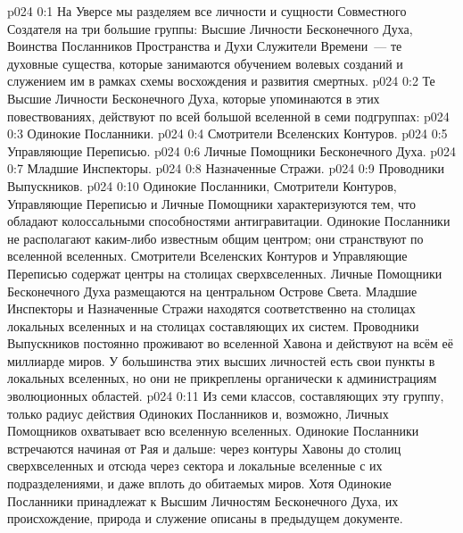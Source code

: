 \author{Божественный Советник}
\vs p024 0:1 На Уверсе мы разделяем все личности и сущности Совместного Создателя на три большие группы: Высшие Личности Бесконечного Духа, Воинства Посланников Пространства и Духи Служители Времени~--- те духовные существа, которые занимаются обучением волевых созданий и служением им в рамках схемы восхождения и развития смертных.
\vs p024 0:2 \pc Те Высшие Личности Бесконечного Духа, которые упоминаются в этих повествованиях, действуют по всей большой вселенной в семи подгруппах:
\vs p024 0:3 Одинокие Посланники.
\vs p024 0:4 Смотрители Вселенских Контуров.
\vs p024 0:5 Управляющие Переписью.
\vs p024 0:6 Личные Помощники Бесконечного Духа.
\vs p024 0:7 Младшие Инспекторы.
\vs p024 0:8 Назначенные Стражи.
\vs p024 0:9 Проводники Выпускников.
\vs p024 0:10 \pc Одинокие Посланники, Смотрители Контуров, Управляющие Переписью и Личные Помощники характеризуются тем, что обладают колоссальными способностями антигравитации. Одинокие Посланники не располагают каким\hyp{}либо известным общим центром; они странствуют по вселенной вселенных. Смотрители Вселенских Контуров и Управляющие Переписью содержат центры на столицах сверхвселенных. Личные Помощники Бесконечного Духа размещаются на центральном Острове Света. Младшие Инспекторы и Назначенные Стражи находятся соответственно на столицах локальных вселенных и на столицах составляющих их систем. Проводники Выпускников постоянно проживают во вселенной Хавона и действуют на всём её миллиарде миров. У большинства этих высших личностей есть свои пункты в локальных вселенных, но они не прикреплены органически к администрациям эволюционных областей.
\vs p024 0:11 Из семи классов, составляющих эту группу, только радиус действия Одиноких Посланников и, возможно, Личных Помощников охватывает всю вселенную вселенных. Одинокие Посланники встречаются начиная от Рая и дальше: через контуры Хавоны до столиц сверхвселенных и отсюда через сектора и локальные вселенные с их подразделениями, и даже вплоть до обитаемых миров. Хотя Одинокие Посланники принадлежат к Высшим Личностям Бесконечного Духа, их происхождение, природа и служение описаны в предыдущем документе.
